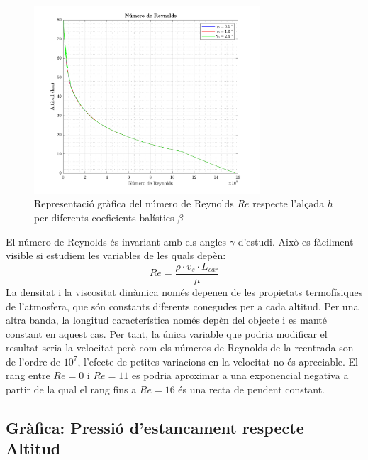 \begin{figure}[ht]
    \centering
    \includegraphics[width=0.75\textwidth]{imagenes/02_lifting_graficas/reynolds.pdf}
    \caption{Representació gràfica del número de Reynolds $Re$ respecte l'alçada $h$ per diferents coeficients balístics $\beta$}
    \label{fig:reynolds_lift}
\end{figure}

El número de Reynolds és invariant amb els angles $\gamma$ d'estudi. Això es fàcilment visible si estudiem les variables de les quals depèn:
\begin{equation}
    Re = \frac{\rho \cdot v_s \cdot L_{car}}{\mu}
\end{equation}
La densitat i la viscositat dinàmica només depenen de les propietats termofísiques de l'atmosfera, que són constants diferents conegudes per a cada altitud. Per una altra banda, la longitud característica només depèn del objecte i es manté constant en aquest cas. \newline
Per tant, la única variable que podria modificar el resultat seria la velocitat però com els números de Reynolds de la reentrada son de l'ordre de $10^7$, l'efecte de petites variacions en la velocitat no és apreciable. \newline
El rang entre $Re = 0$ i $Re = 11$ es podria aproximar a una exponencial negativa a partir de la qual el rang fins a $Re = 16$ és una recta de pendent constant.

\newpage
\subsection{Gràfica: Pressió d'estancament respecte Altitud}

